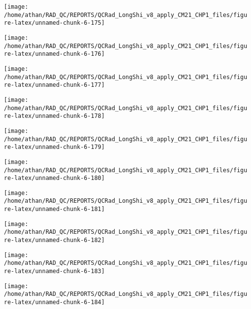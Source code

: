 \documentclass[
  10pt,
  a4paper,oneside]{article}
\begin{document}
\begin{center}\texttt{[image: /home/athan/RAD\_QC/REPORTS/QCRad\_LongShi\_v8\_apply\_CM21\_CHP1\_files/figure-latex/unnamed-chunk-6-175]} \end{center}

\begin{center}\texttt{[image: /home/athan/RAD\_QC/REPORTS/QCRad\_LongShi\_v8\_apply\_CM21\_CHP1\_files/figure-latex/unnamed-chunk-6-176]} \end{center}

\begin{center}\texttt{[image: /home/athan/RAD\_QC/REPORTS/QCRad\_LongShi\_v8\_apply\_CM21\_CHP1\_files/figure-latex/unnamed-chunk-6-177]} \end{center}

\begin{center}\texttt{[image: /home/athan/RAD\_QC/REPORTS/QCRad\_LongShi\_v8\_apply\_CM21\_CHP1\_files/figure-latex/unnamed-chunk-6-178]} \end{center}

\begin{center}\texttt{[image: /home/athan/RAD\_QC/REPORTS/QCRad\_LongShi\_v8\_apply\_CM21\_CHP1\_files/figure-latex/unnamed-chunk-6-179]} \end{center}

\begin{center}\texttt{[image: /home/athan/RAD\_QC/REPORTS/QCRad\_LongShi\_v8\_apply\_CM21\_CHP1\_files/figure-latex/unnamed-chunk-6-180]} \end{center}

\begin{center}\texttt{[image: /home/athan/RAD\_QC/REPORTS/QCRad\_LongShi\_v8\_apply\_CM21\_CHP1\_files/figure-latex/unnamed-chunk-6-181]} \end{center}

\begin{center}\texttt{[image: /home/athan/RAD\_QC/REPORTS/QCRad\_LongShi\_v8\_apply\_CM21\_CHP1\_files/figure-latex/unnamed-chunk-6-182]} \end{center}

\begin{center}\texttt{[image: /home/athan/RAD\_QC/REPORTS/QCRad\_LongShi\_v8\_apply\_CM21\_CHP1\_files/figure-latex/unnamed-chunk-6-183]} \end{center}

\begin{center}\texttt{[image: /home/athan/RAD\_QC/REPORTS/QCRad\_LongShi\_v8\_apply\_CM21\_CHP1\_files/figure-latex/unnamed-chunk-6-184]} \end{center}
\end{document}
